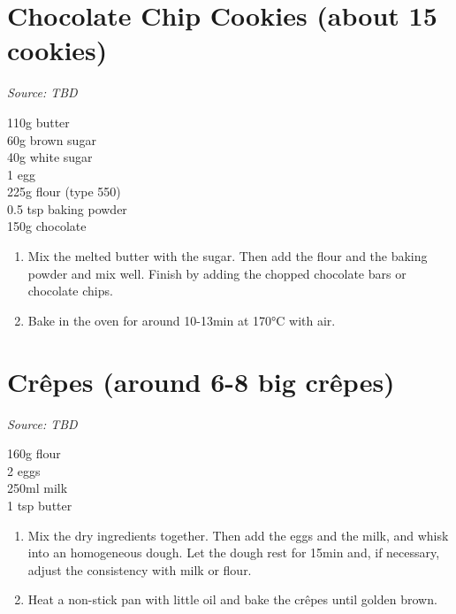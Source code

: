 \documentclass{report}
\begin{document}
\section[Chocolate Chip Cookies]{Chocolate Chip Cookies (about 15 cookies)}
\textit{Source: TBD}\\
\begin{minipage}[t]{0.21\textwidth} \vspace{0pt} 
110g butter\\
60g brown sugar\\
40g white sugar\\
1 egg\\
225g flour (type 550)\\
0.5 tsp baking powder\\
150g chocolate
\end{minipage}
\hfill
\begin{minipage}[t]{0.78\textwidth} \vspace{0pt}
	\begin{enumerate}
		\item Mix the melted butter with the sugar. Then add the flour and the baking powder and mix well. Finish by adding the chopped chocolate bars or chocolate chips.
		\item Bake in the oven for around 10-13min at 170°C with air.
	\end{enumerate}	
\end{minipage}

\section[Crêpes]{Crêpes (around 6-8 big crêpes)}
\textit{Source: TBD}\\
\begin{minipage}[t]{0.21\textwidth} \vspace{0pt}
160g flour\\
2 eggs\\
250ml milk\\
1 tsp butter
\end{minipage}
\hfill
\begin{minipage}[t]{0.78\textwidth} \vspace{0pt}
	\begin{enumerate}
		\item Mix the dry ingredients together. Then add the eggs and the milk, and whisk into an homogeneous dough. Let the dough rest for 15min and, if necessary, adjust the consistency with milk or flour.
		\item Heat a non-stick pan with little oil and bake the crêpes until golden brown.
	\end{enumerate}	
\end{minipage}
\end{document}
